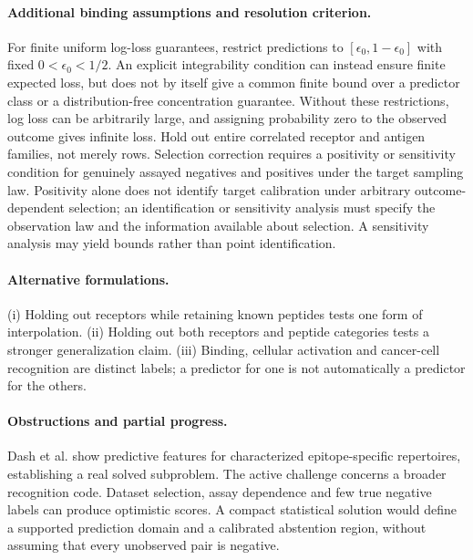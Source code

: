 \documentclass[11pt]{article}
\begin{document}
\paragraph{Additional binding assumptions and resolution criterion.} For finite uniform log-loss guarantees, restrict predictions to $[\epsilon_0,1-\epsilon_0]$ with fixed $0<\epsilon_0<1/2$. An explicit integrability condition can instead ensure finite expected loss, but does not by itself give a common finite bound over a predictor class or a distribution-free concentration guarantee. Without these restrictions, log loss can be arbitrarily large, and assigning probability zero to the observed outcome gives infinite loss. Hold out entire correlated receptor and antigen families, not merely rows. Selection correction requires a positivity or sensitivity condition for genuinely assayed negatives and positives under the target sampling law. Positivity alone does not identify target calibration under arbitrary outcome-dependent selection; an identification or sensitivity analysis must specify the observation law and the information available about selection. A sensitivity analysis may yield bounds rather than point identification.

\paragraph{Alternative formulations.} (i) Holding out receptors while retaining known peptides tests one form of interpolation. (ii) Holding out both receptors and peptide categories tests a stronger generalization claim. (iii) Binding, cellular activation and cancer-cell recognition are distinct labels; a predictor for one is not automatically a predictor for the others.
\paragraph{Obstructions and partial progress.} Dash et al. show predictive features for characterized epitope-specific repertoires, establishing a real solved subproblem. The active challenge concerns a broader recognition code. Dataset selection, assay dependence and few true negative labels can produce optimistic scores. A compact statistical solution would define a supported prediction domain and a calibrated abstention region, without assuming that every unobserved pair is negative.
\end{document}
